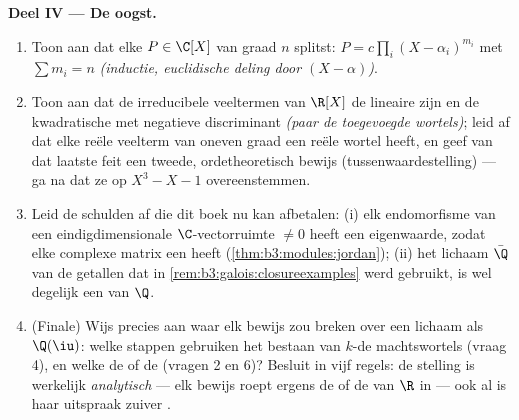 \begin{problem}
\medskip
\noindent\textbf{Deel IV --- De oogst.}
\begin{enumerate}[resume]
  \item Toon aan dat elke $P \in \C[X]$ van graad $n$ splitst: $P
        = c\prod_{i}(X - \alpha_i)^{m_i}$ met $\sum m_i = n$
        \emph{(inductie, euclidische deling door $(X -
        \alpha)$)}.
  \item Toon aan dat de irreducibele veeltermen van $\R[X]$ de
        lineaire zijn en de kwadratische met negatieve
        discriminant \emph{(paar de toegevoegde wortels)}; leid
        af dat elke reële veelterm van oneven graad een reële
        wortel heeft, en geef van dat laatste feit een tweede,
        ordetheoretisch bewijs (tussenwaardestelling) --- ga na
        dat ze op $X^3 - X - 1$ overeenstemmen.
  \item Leid de schulden af die dit boek nu kan afbetalen: (i)
        elk endomorfisme van een eindigdimensionale
        $\C$-vectorruimte $\neq 0$ heeft een eigenwaarde, zodat
        elke complexe matrix een  heeft
        (\cref{thm:b3:modules:jordan}); (ii) het lichaam
        $\bar\Q$ van de  getallen dat in
        \cref{rem:b3:galois:closureexamples} werd gebruikt, is
        wel degelijk een  van $\Q$.
  \item (Finale) Wijs precies aan waar elk bewijs zou breken over
        een lichaam als $\Q(\iu)$: welke stappen gebruiken het
        bestaan van $k$-de machtswortels (vraag 4), en welke de
         of de  (vragen 2 en 6)? Besluit
        in vijf regels: de stelling is werkelijk
        \emph{analytisch} --- elk bewijs roept ergens de
         of de  van $\R$ in --- ook al is
        haar uitspraak zuiver .
\end{enumerate}


\end{problem}
